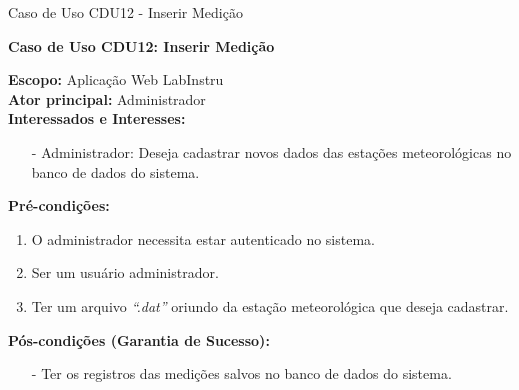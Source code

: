 \begin{quadro}[H]
	\centering
	\caption{Caso de Uso CDU12 - Inserir Medição}

	\begin{framed}

		\textbf{Caso de Uso CDU12: Inserir Medição}\\

		\begin{flushleft}

		\textbf{Escopo:} Aplicação Web LabInstru\\

		\textbf{Ator principal:} Administrador\\

		\textbf{Interessados e Interesses:}
		\begin{itemize}
			\item[-] Administrador: Deseja cadastrar novos dados das estações meteorológicas no banco de dados do sistema.
		\end{itemize}

		\textbf{Pré-condições:}\\
			 \begin{enumerate}
			 	\item{O administrador necessita estar autenticado no sistema.}
			 	\item{Ser um usuário administrador}.
				\item Ter um arquivo \textit{``.dat''} oriundo da estação meteorológica que deseja cadastrar.
			 \end{enumerate}

		\textbf{Pós-condições (Garantia de Sucesso):}
		\begin{itemize}
			\item[-] Ter os registros das medições salvos no banco de dados do sistema.
		\end{itemize}



\end{flushleft}
\end{framed}
\end{quadro}
